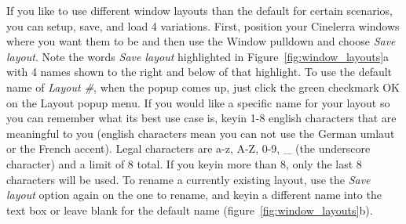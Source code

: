 If you like to use different window layouts than the default for certain scenarios, you can setup, save, and load 4 variations.   
First, position your Cinelerra windows where you want them to be and then use the Window pulldown and choose \emph{Save layout}. Note the words \emph{Save layout} highlighted in Figure~\ref{fig:window_layouts}a with 4 names shown to the right and below of that highlight. 
To use the default name of \textit{Layout \#}, when the popup comes up, just click the green checkmark OK on the Layout popup menu.  
If you would like a specific name for your layout so you can remember what its best use case is,
keyin 1-8 english characters that are meaningful to you (english characters mean you can not use the German umlaut or the French accent).  
Legal characters are a-z, A-Z, 0-9, \_ (the underscore character) and a limit of 8 total.  
If you keyin more than 8, only the last 8 characters will be used.  
To rename a currently existing layout, use the \emph{Save layout} option again on the one to rename, and keyin a different name into the text box or leave blank for the default name (figure~\ref{fig:window_layouts}b).

